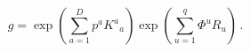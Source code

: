 \begin{equation}
\label{explicit} g=\exp (\sum_{a=1}^D p^a K^a{}_a) \exp (\sum_{u=1}^q \Phi^u
R_u)\, .
\end{equation} 
